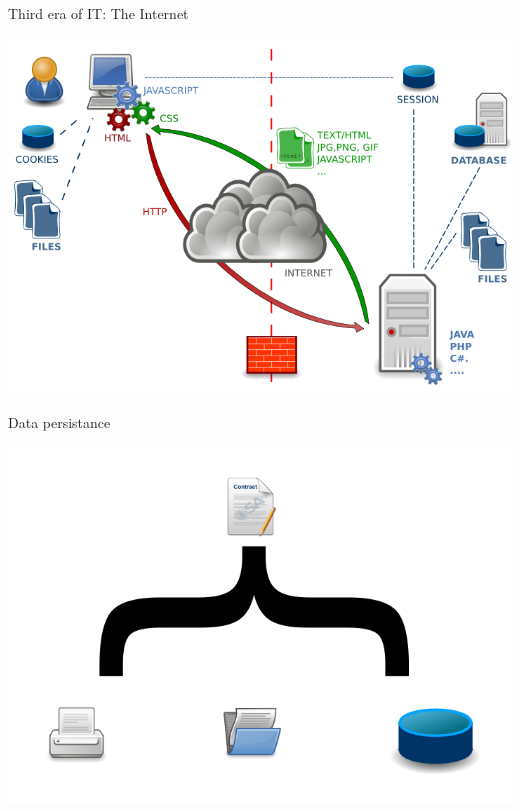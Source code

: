 {  \begin{frame}{Third era of IT: The Internet}
    \begin{center}
      \includegraphics[scale=0.3]{img/internet.png}
    \end{center}
  \end{frame}

  \begin{frame}{Data persistance}
    \begin{center}
      \includegraphics[scale=0.3]{img/persistance.png}
    \end{center}
  \end{frame}



}

